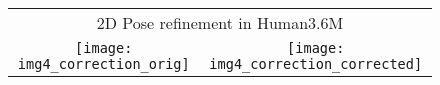 \documentclass[10pt,twocolumn,letterpaper]{article}
\begin{document}
\begin{figure}\vspace{-11mm}
    \begin{center}
      \vspace{1.2cm}
\begin{tabular}{cc}
      \multicolumn{2}{c}{2D Pose refinement in Human3.6M}\\
\texttt{[image: img4\_correction\_orig]}  & 
\texttt{[image: img4\_correction\_corrected]}  \\
\end{tabular}
\end{center}

\end{figure}
\end{document}
